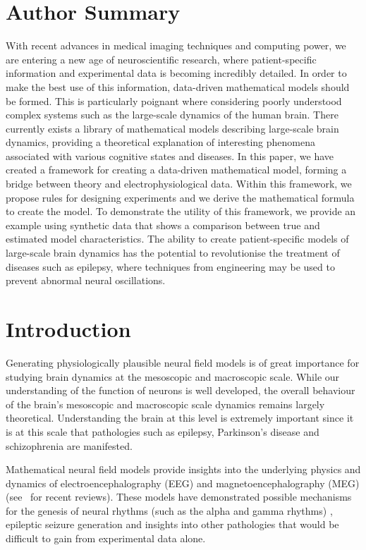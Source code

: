 \documentclass[10pt]{article}
\begin{document}
\section*{Author Summary}
With recent advances in medical imaging techniques and computing power, we are entering a new age of neuroscientific research, where patient-specific information and experimental data is becoming incredibly detailed. In order to make the best use of this information, data-driven mathematical models should be formed. This is particularly poignant where considering poorly understood complex systems such as the large-scale dynamics of the human brain. There currently exists a library of mathematical models describing large-scale brain dynamics, providing a theoretical explanation of interesting phenomena associated with various cognitive states and diseases. In this paper, we have created a framework for creating a data-driven mathematical model, forming a bridge between theory and electrophysiological data. Within this framework, we propose rules for designing experiments and we derive the mathematical formula to create the model. To demonstrate the utility of this framework, we provide an example using synthetic data that shows a comparison between true and estimated model characteristics. The ability to create patient-specific models of large-scale brain dynamics has the potential to revolutionise the treatment of diseases such as epilepsy, where techniques from engineering may be used to prevent abnormal neural oscillations.

\section*{Introduction}
Generating physiologically plausible neural field models is of great importance for studying brain dynamics at the mesoscopic and macroscopic scale. While our understanding of the function of neurons is well developed, the overall behaviour of the brain's mesoscopic and macroscopic scale dynamics remains largely theoretical. Understanding the brain at this level is extremely important since it is at this scale that pathologies such as epilepsy, Parkinson's disease and schizophrenia are manifested. 

Mathematical neural field models provide insights into the underlying physics and dynamics of electroencephalography (EEG) and magnetoencephalography (MEG) (see~\cite{Deco2008,David2003} for recent reviews). These models have demonstrated possible mechanisms for the genesis of neural rhythms (such as the alpha and gamma rhythms) \cite{Liley1999,RENNIE2000}, epileptic seizure generation \cite{DaSilva2003,Suffczynski2004,Wendling2005} and insights into other pathologies \cite{Moran2008,Schiff2009} that would be difficult to gain from experimental data alone. 
\end{document}
